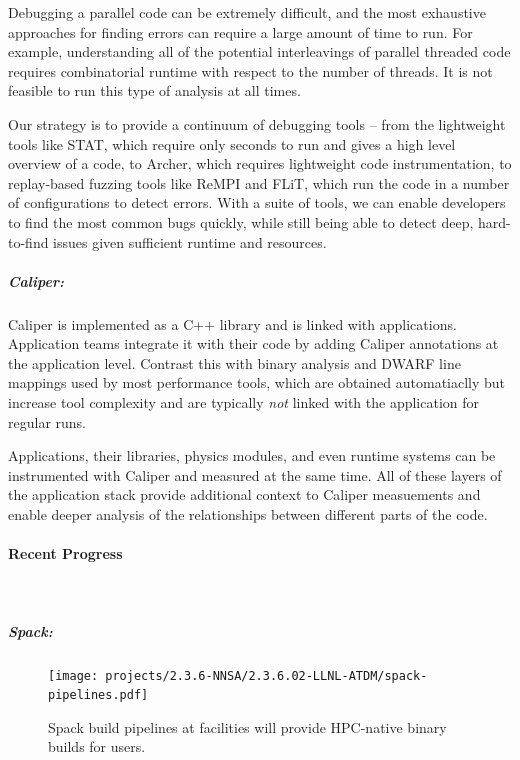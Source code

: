 Debugging a parallel code can be extremely difficult, and the most
exhaustive approaches for finding errors can require a large amount of
time to run.  For example, understanding all of the potential
interleavings of parallel threaded code requires combinatorial runtime
with respect to the number of threads.  It is not feasible to run this
type of analysis at all times.

Our strategy is to provide a continuum of debugging tools -- from the
lightweight tools like STAT, which require only seconds to run and gives
a high level overview of a code, to Archer, which requires lightweight
code instrumentation, to replay-based fuzzing tools like ReMPI and FLiT,
which run the code in a number of configurations to detect errors.  With
a suite of tools, we can enable developers to find the most common bugs
quickly, while still being able to detect deep, hard-to-find issues given
sufficient runtime and resources.

\subparagraph{Caliper:}
Caliper is implemented as a C++ library and is linked with applications.
Application teams integrate it with their code by adding Caliper
annotations at the application level.  Contrast this with binary analysis
and DWARF line mappings used by most performance tools, which are
obtained automatiaclly but increase tool complexity and are typically
{\it not} linked with the application for regular runs.

Applications, their libraries, physics modules, and even runtime systems
can be instrumented with Caliper and measured at the same time.  All of
these layers of the application stack provide additional context to
Caliper measuements and enable deeper analysis of the relationships
between different parts of the code.



\paragraph{Recent Progress} \leavevmode \\


\subparagraph{Spack:}
\begin{figure}[tb]
\centering
\texttt{[image: projects/2.3.6-NNSA/2.3.6.02-LLNL-ATDM/spack-pipelines.pdf]}
\caption{Spack build pipelines at facilities will provide HPC-native binary builds for users.}
\end{figure}


